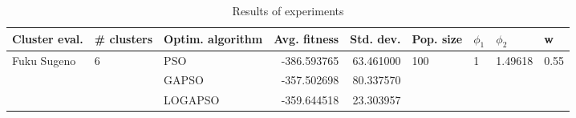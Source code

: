 \begin{table}
\centering
\caption{Results of experiments}
\begin{tabular}{lllrrllll}
\toprule
               Cluster eval. &        \# clusters & Optim. algorithm &  Avg. fitness &  Std. dev. &            Pop. size &         $\phi_{1}$ &               $\phi_{2}$ &                     w \\
\midrule
\multirow{3}{*}{Fuku Sugeno} & \multirow{3}{*}{6} &              PSO &   -386.593765 &  63.461000 & \multirow{3}{*}{100} & \multirow{3}{*}{1} & \multirow{3}{*}{1.49618} & \multirow{3}{*}{0.55} \\
                             &                    &            GAPSO &   -357.502698 &  80.337570 &                      &                    &                          &                       \\
                             &                    &          LOGAPSO &   -359.644518 &  23.303957 &                      &                    &                          &                       \\
\bottomrule
\end{tabular}
\end{table}
